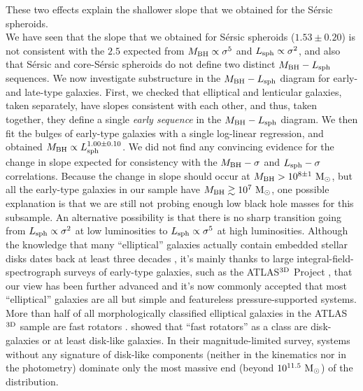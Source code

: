 \documentclass[preprint2]{emulateapj}
\begin{document}
These two effects explain the shallower slope that we obtained for the S\'ersic spheroids. \\
We have seen that the slope that we obtained for S\'ersic spheroids ($1.53 \pm 0.20$) is not consistent with the $2.5$ 
expected from $M_{\rm BH} \propto \sigma^5$ and $L_{\rm sph} \propto \sigma^2$, 
and also that S\'ersic and core-S\'ersic spheroids do not define two distinct $M_{\rm BH} - L_{\rm sph}$ sequences. 
We now investigate substructure in the $M_{\rm BH} - L_{\rm sph}$ diagram for early- and late-type galaxies.
First, we checked that elliptical and lenticular galaxies, taken separately, have slopes consistent with each other, 
and thus, taken together, they define a single \emph{early sequence} in the $M_{\rm BH} - L_{\rm sph}$ diagram. 
We then fit the bulges of early-type galaxies with a single log-linear regression, 
and obtained $M_{\rm BH} \propto L_{\rm sph}^{1.00 \pm 0.10}$. 
We did not find any convincing evidence for the change in slope expected for consistency 
with the $M_{\rm BH} - \sigma$ and $L_{\rm sph} - \sigma$ correlations. 
Because the change in slope should occur at $M_{\rm BH} > 10^{8 \pm 1}\rm~M_\odot$, 
but all the early-type galaxies in our sample have $M_{\rm BH} \gtrsim 10^7\rm~M_\odot$, 
one possible explanation is that we are still not probing enough low black hole masses for this subsample.
An alternative possibility is that there is no sharp transition going from $L_{\rm sph} \propto \sigma^2$ at low luminosities 
to $L_{\rm sph} \propto \sigma^5$ at high luminosities. 
Although the knowledge that many ``elliptical'' galaxies actually contain embedded stellar disks dates back  
at least three decades  
\citep{capaccioli1987,carter1987,rixwhite1990,bender1990,scorzabender1990,nieto1991,rixwhite1992,scorzabender1995},
it's mainly thanks to large integral-field-spectrograph surveys of early-type galaxies, such as the ATLAS$^{\rm 3D}$ Project \citep{cappellari2011}, 
that our view has been further advanced 
and it's now commonly accepted that most ``elliptical'' galaxies are all but simple and featureless pressure-supported systems. 
More than half of all morphologically classified elliptical galaxies in the ATLAS$^{\rm 3D}$ sample are fast rotators \citep{atlas3dIII-MNRAS}.
\cite{krajnovic2013} showed that ``fast rotators'' as a class are disk-galaxies or at least disk-like galaxies. 
In their magnitude-limited survey, systems 
without any signature of disk-like components (neither in the kinematics nor in the photometry) 
dominate only the most massive end (beyond $10^{11.5}~\rm M_\odot$) of the distribution. 
\end{document}

